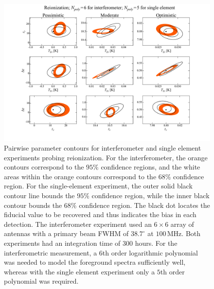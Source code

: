 \documentclass[twocolumn,apj,numberedappendix]{emulateapj}
\newcommand{\acl}[1]{}
\begin{document}
\begin{figure}[t]
	\centering
	\includegraphics[width=1.00\textwidth,trim=3cm 2cm 3cm 0cm,clip] {figures/reionContoursPoly6Poly5.pdf}
	\caption{\acl{Updated this} Pairwise parameter contours for interferometer and single element experiments probing reionization. For the interferometer, the orange contours correspond to the $95\%$ confidence regions, and the white areas within the orange contours correspond to the $68\%$ confidence region. For the single-element experiment, the outer solid black contour line bounds the $95\%$ confidence region, while the inner black contour bounds the $68\%$ confidence region. The black dot locates the fiducial value to be recovered and thus indicates the bias in each detection. The interferometer experiment used an $6\times 6$ array of antennas with a primary beam FWHM of $38.7^\circ$ at $100\,\textrm{MHz}$. Both experiments had an integration time of 300 hours. For the interferometric measurement, a $6$th order logarithmic polynomial was needed to model the foreground spectra sufficiently well, whereas with the single element experiment only a $5$th order polynomial was required.}
	\label{fig:reionContoursPoly7Poly7}
\end{figure}
\end{document}
